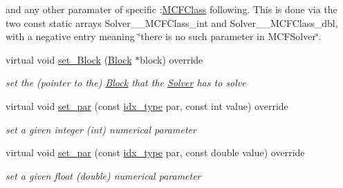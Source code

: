 \begin{Indent}
{and any other paramater of specific \+:\mbox{\hyperlink{class_m_c_f_class}{M\+C\+F\+Class}} following. This is done via the two const static arrays Solver\+\_\+\_\+\+M\+C\+F\+Class\+\_\+int and Solver\+\_\+\_\+\+M\+C\+F\+Class\+\_\+dbl, with a negative entry meaning \char`\"{}there is no such
parameter in M\+C\+F\+Solver\char`\"{}. }\begin{DoxyCompactItemize}
\item 
\mbox{\label{class_s_m_spp__di__unipi__it_1_1_m_c_f_solver_a8d7fb698416759f38941e06b23cccaec}} 
virtual void \mbox{\hyperlink{class_s_m_spp__di__unipi__it_1_1_m_c_f_solver_a8d7fb698416759f38941e06b23cccaec}{set\+\_\+\+Block}} (\mbox{\hyperlink{class_s_m_spp__di__unipi__it_1_1_block}{Block}} $\ast$block) override
\begin{DoxyCompactList}\small\item\em set the (pointer to the) \mbox{\hyperlink{class_s_m_spp__di__unipi__it_1_1_block}{Block}} that the \mbox{\hyperlink{class_s_m_spp__di__unipi__it_1_1_solver}{Solver}} has to solve \end{DoxyCompactList}\item 
virtual void \mbox{\hyperlink{class_s_m_spp__di__unipi__it_1_1_m_c_f_solver_ab8ce512bc43533d07e9ebf93d44c515d}{set\+\_\+par}} (const \mbox{\hyperlink{class_s_m_spp__di__unipi__it_1_1_thin_compute_interface_aa3d710629ad8c434286726ad810c3b47}{idx\+\_\+type}} par, const int value) override
\begin{DoxyCompactList}\small\item\em set a given integer (int) numerical parameter \end{DoxyCompactList}\item 
virtual void \mbox{\hyperlink{class_s_m_spp__di__unipi__it_1_1_m_c_f_solver_a341557f3dd81bff0f060dbe41a4ba325}{set\+\_\+par}} (const \mbox{\hyperlink{class_s_m_spp__di__unipi__it_1_1_thin_compute_interface_aa3d710629ad8c434286726ad810c3b47}{idx\+\_\+type}} par, const double value) override
\begin{DoxyCompactList}\small\item\em set a given float (double) numerical parameter \end{DoxyCompactList}\end{DoxyCompactItemize}
\end{Indent}

